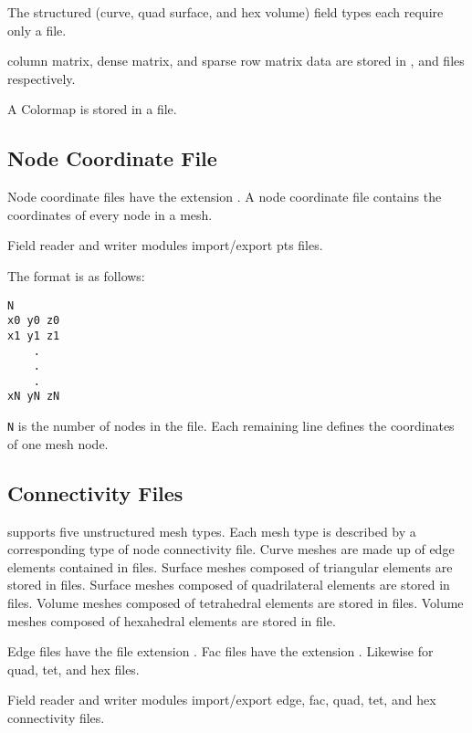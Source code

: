 The structured (curve, quad surface, and hex volume) field types each
require only a  file.

\sr{} column matrix, dense matrix, and sparse row matrix data are
stored in ,  and  files respectively.

A Colormap is stored in a  file.

\subsection{Node Coordinate File}
\label{sec:node_loc_fmt}

Node coordinate files have the extension .  A node
coordinate file contains the coordinates of every node in a mesh.

Field reader and writer modules import/export pts files.

The format is as follows:

\begin{verbatim}
N
x0 y0 z0
x1 y1 z1
    .
    .
    .
xN yN zN
\end{verbatim}

\verb|N| is the number of nodes in the file.  Each remaining line
defines the coordinates of one mesh node.

\subsection{Connectivity Files}
\label{sec:node_conn_fmt}

\sr{} supports five unstructured mesh types.  Each mesh type is
described by a corresponding type of node connectivity file.  Curve
meshes are made up of edge elements contained in  files.
Surface meshes composed of triangular elements are stored in 
files.  Surface meshes composed of quadrilateral elements are stored
in  files.  Volume meshes composed of tetrahedral elements
are stored in  files.  Volume meshes composed of hexahedral
elements are stored in  file.

Edge files have the file extension .  Fac files have
the extension .  Likewise for quad, tet, and hex files.

Field reader and writer modules import/export edge, fac, quad, tet,
and hex connectivity files.

